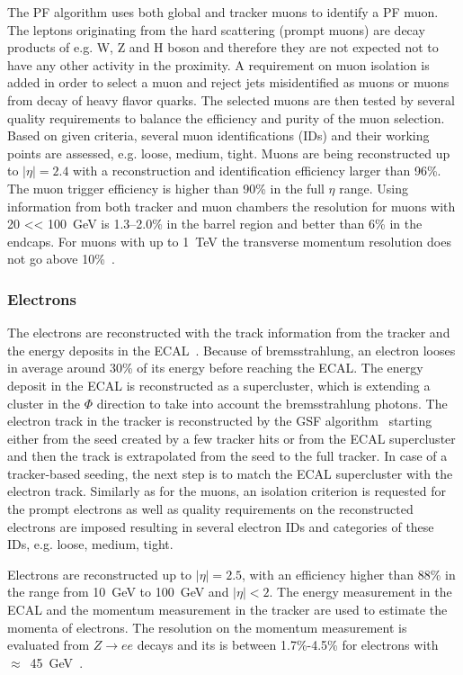 The PF algorithm uses both global and tracker muons to identify a PF muon. The leptons originating from the hard scattering (prompt muons)  are decay products of e.g. W, Z and H boson and therefore they are not expected not to have any other activity in the proximity. A requirement on muon isolation is added in order to select a muon and reject jets misidentified as muons or muons from decay of heavy flavor quarks. The selected muons are then tested by several quality requirements to balance the efficiency and purity of the muon selection. Based on given criteria, several muon identifications (IDs) and their working points are assessed, e.g. loose, medium, tight. Muons are being reconstructed up to $|\eta|=2.4$ with a reconstruction and identification efficiency larger than 96\%. The muon trigger efficiency is higher than 90\% in  the full $\eta$ range. Using information from both tracker and muon chambers the \pt resolution for muons with 20 <\pt < 100~GeV is 1.3--2.0\% in the barrel region and better than 6\% in the endcaps. For muons with \pt up to 1~TeV the transverse momentum resolution does not go above 10\%~\cite{Chatrchyan:2012xi}.

\subsubsection{Electrons}

The electrons are reconstructed with the track information from the tracker and the energy deposits in the ECAL~\cite{Khachatryan:2015hwa}. Because of bremsstrahlung, an electron looses in average around 30\% of its energy before reaching the ECAL. The energy deposit in the ECAL is reconstructed as a supercluster, which is extending a cluster in the $\Phi$ direction to take  into account the bremsstrahlung photons. The electron track in the tracker is reconstructed by the GSF algorithm~\cite{Adam:2003kg} starting either from the seed created by a few tracker hits or from the ECAL supercluster and then the track is extrapolated from the seed to the full tracker. In case of a tracker-based seeding, the next step is to match the ECAL supercluster with the electron track. Similarly as for the muons, an isolation criterion is requested for the prompt electrons as well as quality requirements on the reconstructed electrons are imposed resulting in several electron IDs and categories of these IDs, e.g. loose, medium, tight.

Electrons are reconstructed up to $|\eta|=2.5$,  with an efficiency higher than 88\% in the \pt range from 10~GeV to 100~GeV and $|\eta|<2$. The energy measurement in the ECAL and the momentum measurement in the tracker are used to estimate the momenta of electrons. The resolution on the momentum measurement is evaluated from $Z \rightarrow ee$ decays and its is between 1.7\%-4.5\% for electrons with  \pt~$\approx$~45~GeV~\cite{Khachatryan:2015hwa}.



